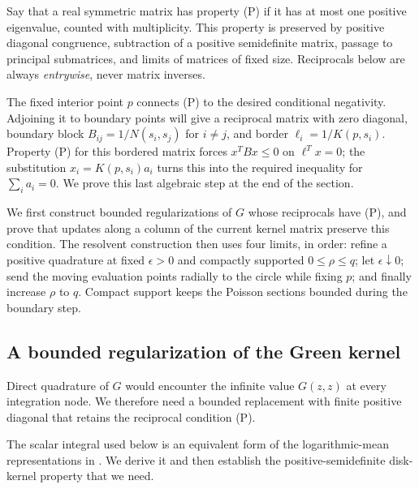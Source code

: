 Say that a real symmetric matrix has property \textup{(P)} if it has at most one positive eigenvalue, counted with multiplicity. This property is preserved by positive diagonal congruence, subtraction of a positive semidefinite matrix, passage to principal submatrices, and limits of matrices of fixed size. Reciprocals below are always \emph{entrywise}, never matrix inverses.

The fixed interior point $p$ connects \textup{(P)} to the desired conditional negativity. Adjoining it to boundary points will give a reciprocal matrix with zero diagonal, boundary block $B_{ij}=1/N(s_i,s_j)$ for $i\ne j$, and border $\ell_i=1/K(p,s_i)$. Property \textup{(P)} for this bordered matrix forces $x^TBx\le0$ on $\ell^Tx=0$; the substitution $x_i=K(p,s_i)a_i$ turns this into the required inequality for $\sum_i a_i=0$. We prove this last algebraic step at the end of the section.

We first construct bounded regularizations of $G$ whose reciprocals have \textup{(P)}, and prove that updates along a column of the current kernel matrix preserve this condition. The resolvent construction then uses four limits, in order: refine a positive quadrature at fixed $\epsilon>0$ and compactly supported $0\le\rho\le q$; let $\epsilon\downarrow0$; send the moving evaluation points radially to the circle while fixing $p$; and finally increase $\rho$ to $q$. Compact support keeps the Poisson sections bounded during the boundary step.

\subsection{A bounded regularization of the Green kernel}

Direct quadrature of $G$ would encounter the infinite value $G(z,z)$ at every integration node. We therefore need a bounded replacement with finite positive diagonal that retains the reciprocal condition \textup{(P)}.

The scalar integral used below is an equivalent form of the logarithmic-mean representations in \cite{QiZhangLi2014}. We derive it and then establish the positive-semidefinite disk-kernel property that we need.


